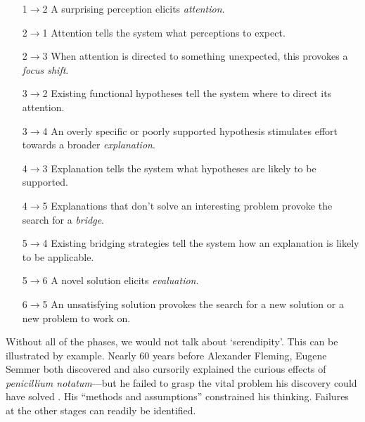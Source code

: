 \begin{itemize}
\item[1$\rightarrow$2] A surprising perception elicits \emph{attention}.
\item[2$\rightarrow$1] Attention tells the system what perceptions to expect.
\item[2$\rightarrow$3] When attention is directed to something unexpected, this provokes a \emph{focus shift}.
\item[3$\rightarrow$2] Existing functional hypotheses tell the system where to direct its attention.
\item[3$\rightarrow$4] An overly specific or poorly supported hypothesis stimulates effort towards a broader \emph{explanation}.
\item[4$\rightarrow$3] Explanation tells the system what hypotheses are likely to be supported.
\item[4$\rightarrow$5] Explanations that don't solve an interesting problem provoke the search for a \emph{bridge}.
\item[5$\rightarrow$4] Existing bridging strategies tell the system how an explanation is likely to be applicable.
\item[5$\rightarrow$6] A novel solution elicits \emph{evaluation}.
\item[6$\rightarrow$5] An unsatisfying solution provokes the search for a new solution or a new problem to work on.
\end{itemize}


Without all of the phases, we would not talk about `serendipity'. This
can be illustrated by example.  Nearly 60 years before Alexander 
Fleming, Eugene Semmer both discovered and also cursorily explained
the curious effects of \emph{penicillium notatum}---but he failed to
grasp the vital problem his discovery could have solved
\cite[p.~75]{cropley2013creativity}.  His ``methods and assumptions''
\cite[p.~131]{floppyearedrabbits1958barber} constrained his thinking.
Failures at the other stages can readily be identified.


